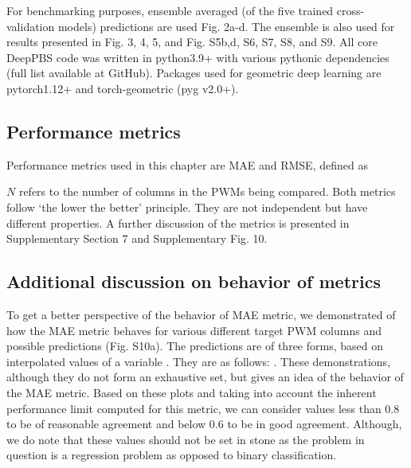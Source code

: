 For benchmarking purposes, ensemble averaged (of the five trained cross-validation models) predictions are used Fig. 2a-d. The ensemble is also used for results presented in Fig. 3, 4, 5, and Fig. S5b,d, S6, S7, S8, and S9. All core DeepPBS code was written in python3.9+ with various pythonic dependencies (full list available at GitHub). Packages used for geometric deep learning are pytorch1.12+ and torch-geometric (pyg v2.0+).

\subsection{Performance metrics}

Performance metrics used in this chapter are MAE and RMSE, defined as 


$N$ refers to the number of columns in the PWMs being compared. Both metrics follow ‘the lower the better’ principle. They are not independent but have different properties. A further discussion of the metrics is presented in Supplementary Section 7 and Supplementary Fig. 10.

\subsection{Additional discussion on behavior of metrics}

To get a better perspective of the behavior of MAE metric, we demonstrated of how the MAE metric behaves for various different target PWM columns and possible predictions (Fig. S10a). The predictions are of three forms, based on interpolated values of a variable . They are as follows: %
. These demonstrations, although they do not form an exhaustive set, but gives an idea of the behavior of the MAE metric. Based on these plots and taking into account the inherent performance limit computed for this metric, we can consider values less than 0.8 to be of reasonable agreement and below 0.6 to be in good agreement. Although, we do note that these values should not be set in stone as the problem in question is a regression problem as opposed to binary classification.

